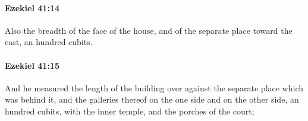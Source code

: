 		\paragraph{Ezekiel 41:14} %
			\label{EZEKIEL-41-14}

			Also the breadth of the face of the house, and of the separate place toward the east, an hundred cubits.


		\paragraph{Ezekiel 41:15} %
			\label{EZEKIEL-41-15}

			And he measured the length of the building over against the separate place which was behind it, and the galleries thereof on the one side and on the other side, an hundred cubits, with the inner temple, and the porches of the court;


